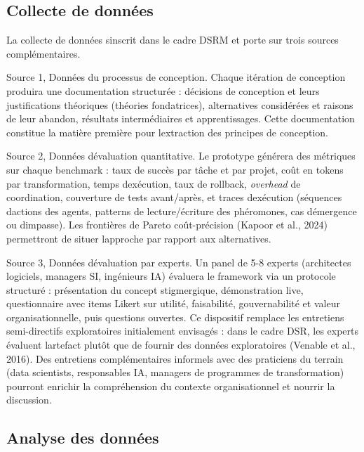 \documentclass[12pt,a4paper]{article}
\begin{document}
\subsection{Collecte de données}\label{collecte-de-donnuxe9es}

La collecte de données s\textquotesingle inscrit dans le cadre DSRM et
porte sur trois sources complémentaires.

Source 1, Données du processus de conception.
Chaque itération de conception produira une documentation structurée :
décisions de conception et leurs justifications théoriques (théories
fondatrices), alternatives considérées et raisons de leur abandon,
résultats intermédiaires et apprentissages. Cette documentation
constitue la matière première pour l\textquotesingle extraction des
principes de conception.

Source 2, Données d\textquotesingle évaluation quantitative.
Le prototype générera des métriques sur chaque benchmark : taux de
succès par tâche et par projet, coût en tokens par transformation,
temps d\textquotesingle exécution, taux de rollback, \emph{overhead}
de coordination, couverture de tests avant/après, et traces
d\textquotesingle exécution (séquences d\textquotesingle actions des
agents, patterns de lecture/écriture des phéromones, cas
d\textquotesingle émergence ou d\textquotesingle impasse). Les
frontières de Pareto coût-précision (Kapoor et al., 2024) permettront de
situer l\textquotesingle approche par rapport aux alternatives.

Source 3, Données d\textquotesingle évaluation par experts.
Un panel de 5-8 experts (architectes logiciels, managers SI, ingénieurs
IA) évaluera le framework via un protocole structuré : présentation du
concept stigmergique, démonstration live, questionnaire avec items
Likert sur utilité, faisabilité, gouvernabilité et valeur
organisationnelle, puis questions ouvertes. Ce dispositif remplace les
entretiens semi-directifs exploratoires initialement envisagés : dans
le cadre DSR, les experts évaluent l\textquotesingle artefact plutôt que
de fournir des données exploratoires (Venable et al., 2016). Des
entretiens complémentaires informels avec des praticiens du terrain
(data scientists, responsables IA, managers de programmes de
transformation) pourront enrichir la compréhension du contexte
organisationnel et nourrir la discussion.

\subsection{Analyse des données}\label{analyse-des-donnuxe9es}
\end{document}
